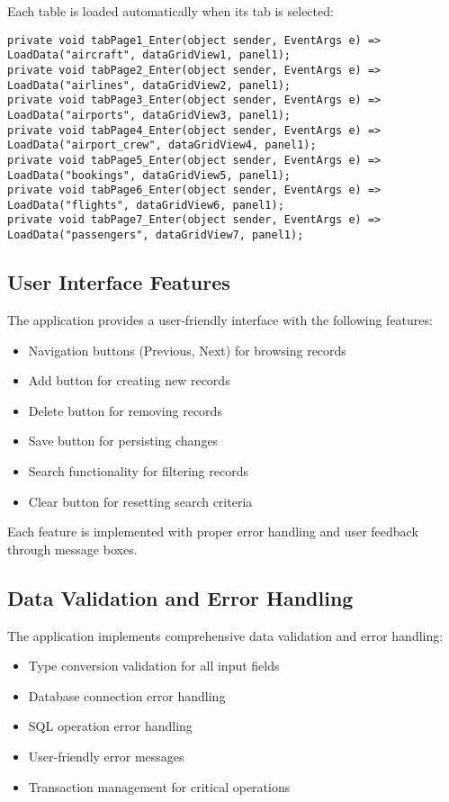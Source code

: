 \documentclass[a4paper,12pt]{article}
\begin{document}
Each table is loaded automatically when its tab is selected:

\begin{lstlisting}[language=CSharp, caption=Table Loading Events]
private void tabPage1_Enter(object sender, EventArgs e) => LoadData("aircraft", dataGridView1, panel1);
private void tabPage2_Enter(object sender, EventArgs e) => LoadData("airlines", dataGridView2, panel1);
private void tabPage3_Enter(object sender, EventArgs e) => LoadData("airports", dataGridView3, panel1);
private void tabPage4_Enter(object sender, EventArgs e) => LoadData("airport_crew", dataGridView4, panel1);
private void tabPage5_Enter(object sender, EventArgs e) => LoadData("bookings", dataGridView5, panel1);
private void tabPage6_Enter(object sender, EventArgs e) => LoadData("flights", dataGridView6, panel1);
private void tabPage7_Enter(object sender, EventArgs e) => LoadData("passengers", dataGridView7, panel1);
\end{lstlisting}

\subsection{User Interface Features}
The application provides a user-friendly interface with the following features:

\begin{itemize}
    \item Navigation buttons (Previous, Next) for browsing records
    \item Add button for creating new records
    \item Delete button for removing records
    \item Save button for persisting changes
    \item Search functionality for filtering records
    \item Clear button for resetting search criteria
\end{itemize}

Each feature is implemented with proper error handling and user feedback through message boxes.

\subsection{Data Validation and Error Handling}
The application implements comprehensive data validation and error handling:

\begin{itemize}
    \item Type conversion validation for all input fields
    \item Database connection error handling
    \item SQL operation error handling
    \item User-friendly error messages
    \item Transaction management for critical operations
\end{itemize}
\end{document}
